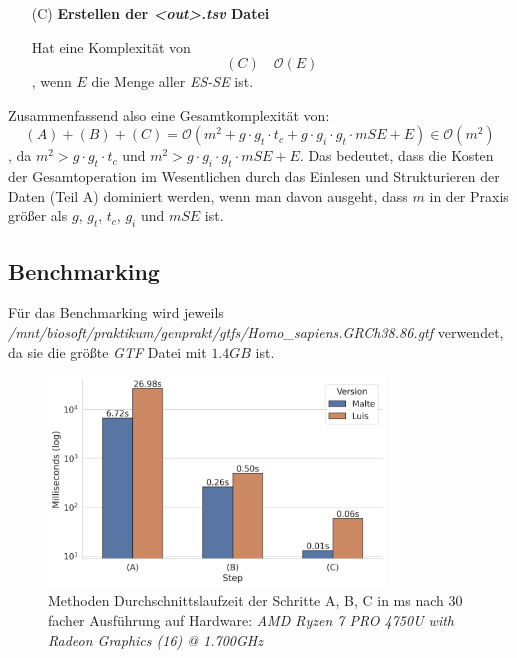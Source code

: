 \documentclass[12pt]{article}
\begin{document}
\begin{enumerate}
	\item[(C)] \textbf{Erstellen der \textit{<out>.tsv} Datei}

		Hat eine Komplexität von
		\begin{equation}
			(C) \hspace{1em} \mathcal{O}(E)
		\end{equation}
		, wenn $E$ die Menge aller \textit{ES-SE} ist.
\end{enumerate}

Zusammenfassend also eine Gesamtkomplexität von:
\begin{equation}
	(A) + (B) + (C) = \mathcal{O}( m^{2} + g \cdot g_{t} \cdot t_{c} + g \cdot g_{i} \cdot g_{t} \cdot mSE + E) \in \mathcal{O}(m^{2})
\end{equation}
, da $m^{2} > g \cdot g_{t} \cdot t_{c}$ und $m^{2} > g \cdot g_{i} \cdot g_{t} \cdot mSE + E$.
Das bedeutet, dass die Kosten der Gesamtoperation im Wesentlichen durch das Einlesen und Strukturieren der Daten (Teil A) dominiert werden,
wenn man davon ausgeht, dass $m$ in der Praxis größer als $g$, $g_{t}$, $t_{c}$, $g_{i}$ und $mSE$ ist.

\subsection{Benchmarking}
Für das Benchmarking wird jeweils \textit{/mnt/biosoft/praktikum/genprakt/gtfs/Homo\_sapiens.GRCh38.86.gtf} verwendet, da sie die grö\ss te \textit{GTF} Datei mit $1.4GB$ ist.

\begin{figure}[htpb]
	\centering
	\includegraphics[width=0.8\textwidth]{./plots/benchmark_time.jpg}
	\caption{Methoden Durchschnittslaufzeit der Schritte A, B, C  in ms nach 30 facher Ausführung auf Hardware: \textit{AMD Ryzen 7 PRO 4750U with Radeon Graphics (16) @ 1.700GHz}}

	\label{fig:-plots-benchmark_time-jpg}
\end{figure}
\end{document}
